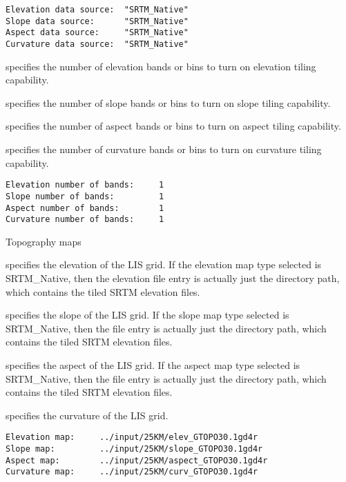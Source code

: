 \begin{Verbatim}[frame=single]
Elevation data source:  "SRTM_Native"
Slope data source:      "SRTM_Native"
Aspect data source:     "SRTM_Native"
Curvature data source:  "SRTM_Native"
 \end{Verbatim}

 
  specifies the number of
 elevation bands or bins to turn on elevation tiling capability.

  specifies the number of
 slope bands or bins to turn on slope tiling capability.

  specifies the number of
 aspect bands or bins to turn on aspect tiling capability.

  specifies the number of
 curvature bands or bins to turn on curvature tiling capability.

 

 \begin{Verbatim}[frame=single]
Elevation number of bands:     1
Slope number of bands:         1
Aspect number of bands:        1
Curvature number of bands:     1
 \end{Verbatim}

 
 Topography maps

  specifies the elevation of the LIS grid.
  If the elevation map type selected is SRTM\_Native, then the
   elevation file entry is actually just the directory path, which
   contains the tiled SRTM elevation files.

  specifies the slope of the LIS grid.
  If the slope map type selected is SRTM\_Native, then the
   file entry is actually just the directory path, which
   contains the tiled SRTM elevation files.

  specifies the aspect of the LIS grid.
  If the aspect map type selected is SRTM\_Native, then the
   file entry is actually just the directory path, which
   contains the tiled SRTM elevation files.

  specifies the curvature of the LIS grid.
 

 \begin{Verbatim}[frame=single]
Elevation map:     ../input/25KM/elev_GTOPO30.1gd4r
Slope map:         ../input/25KM/slope_GTOPO30.1gd4r
Aspect map:        ../input/25KM/aspect_GTOPO30.1gd4r
Curvature map:     ../input/25KM/curv_GTOPO30.1gd4r
 \end{Verbatim}

